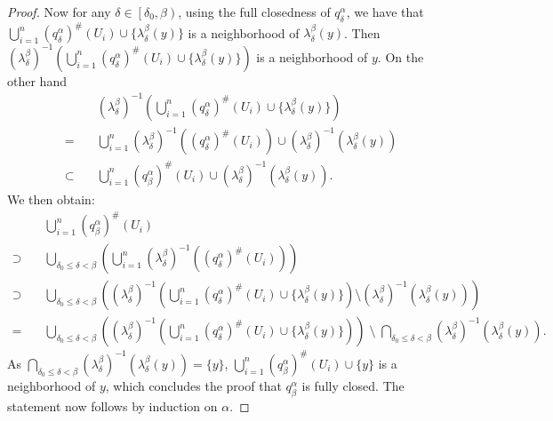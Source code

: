 \documentclass[11pt]{article}
\theoremstyle{definition}
\theoremstyle{remark}
\begin{document}
\begin{proof}
	Now for any $\delta \in \left[\delta_0, \beta\right)$, using the full closedness of $q^\alpha_\delta$, we have that $\bigcup\limits_{i = 1}^n (q^\alpha_\delta)^\# (U_i) \cup \{\lambda^\beta_\delta(y)\}$ is a neighborhood of $\lambda^\beta_\delta (y)$. Then $\left(\lambda^\beta_\delta\right)^{-1}\left(\bigcup\limits_{i = 1}^n (q^\alpha_\delta)^\# (U_i) \cup \{\lambda^\beta_\delta(y)\}\right)$ is a neighborhood of $y$. On the other hand
	\begin{align*}
		&\left(\lambda^\beta_\delta\right)^{-1}\left(\bigcup\limits_{i = 1}^n (q^\alpha_\delta)^\# (U_i) \cup \{\lambda^\beta_\delta(y)\}\right) \\
		= \quad & \bigcup\limits_{i = 1}^n \left(\lambda^\beta_\delta\right)^{-1} \left((q^\alpha_\delta)^\# (U_i)\right) \cup \left(\lambda^\beta_\delta\right)^{-1} \left(\lambda^\beta_\delta(y)\right) \\
		\subset \quad & \bigcup\limits_{i = 1}^n (q^\alpha_\beta)^\# (U_i) \cup \left(\lambda^\beta_\delta\right)^{-1} \left(\lambda^\beta_\delta(y)\right).
	\end{align*}
	We then obtain:
	\begin{align*}
		&\bigcup\limits_{i = 1}^n (q^\alpha_\beta)^\# (U_i) \\
		\supset \quad &\bigcup_{\delta_0 \leq \delta < \beta} \left(\bigcup\limits_{i = 1}^n \left(\lambda^\beta_\delta\right)^{-1} \left((q^\alpha_\delta)^\# (U_i)\right)\right) \\
		\supset \quad &\bigcup_{\delta_0 \leq \delta < \beta} \left(\left(\lambda^\beta_\delta\right)^{-1}\left(\bigcup\limits_{i = 1}^n (q^\alpha_\delta)^\# (U_i) \cup \{\lambda^\beta_\delta(y)\}\right) \setminus \left(\lambda^\beta_\delta\right)^{-1} \left(\lambda^\beta_\delta(y)\right) \right) \\
		= \quad &\bigcup_{\delta_0 \leq \delta < \beta} \left(\left(\lambda^\beta_\delta\right)^{-1}\left(\bigcup\limits_{i = 1}^n (q^\alpha_\delta)^\# (U_i) \cup \{\lambda^\beta_\delta(y)\}\right)\right) \; \setminus \; \bigcap_{\delta_0 \leq \delta < \beta} \left(\lambda^\beta_\delta\right)^{-1} \left(\lambda^\beta_\delta(y)\right).
	\end{align*}
	As $\bigcap\limits_{\delta_0 \leq \delta < \beta} \left(\lambda^\beta_\delta\right)^{-1} \left(\lambda^\beta_\delta(y)\right) = \{y\}$, $\bigcup\limits_{i = 1}^n (q^\alpha_\beta)^\# (U_i) \cup \{y\}$ is a neighborhood of $y$, which concludes the proof that $q^\alpha_\beta$ is fully closed. The statement now follows by induction on $\alpha$.
\end{proof}
\end{document}
